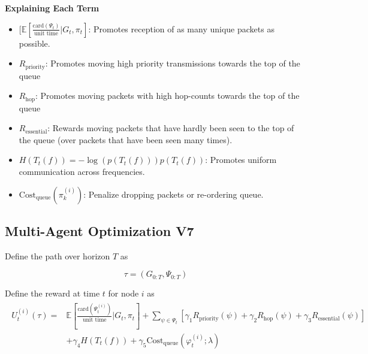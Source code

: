 \documentclass{article}
\begin{document}

\newpage
\textbf{Explaining Each Term}
\begin{itemize}
    \item $ [ \mathbb{E}[\frac{\text{card}(\Psi_{t})}{\text{unit time}} | G_{t}, \pi_{t}]$: Promotes reception of as many unique packets as possible.
    \item $R_{\text{priority}}$: Promotes moving high priority transmissions towards the top of the queue
    
    \item $R_{\text{hop}}$: Promotes moving packets with high hop-counts towards the top of the queue

    \item $R_{\text{essential}}$: Rewards moving packets that have hardly been seen to the top of the queue (over packets that have been seen many times).
    
    \item $H(T_{t}(f))= -\log(p(T_{t}(f))) p(T_{t}(f))$: Promotes uniform communication across frequencies.
    \item $\text{Cost}_{\text{queue}}(\pi_{k}^{(i)})$: Penalize dropping packets or re-ordering queue.
\end{itemize}

\newpage


\subsection{Multi-Agent Optimization V7}


Define the path over horizon $T$ as

$$
\tau = (G_{0:T}, \Psi_{0:T})
$$

Define the reward at time $t$ for node $i$ as
\begin{align*}
    \begin{split}
            U_{t}^{(i)} (\tau)  =
            &\mathbb{E}[\frac{\text{card}(\Psi_{t}^{(i)})}{\text{unit time}} | G_{t}, \pi_{t}] + \sum_{\psi \in \Psi_{t}}[ \gamma_{1} R_{\text{priority}}(\psi) + \gamma_{2} R_{\text{hop}}(\psi)  +  \gamma_{3} R_{\text{essential}}(\psi)]
            \\ &+ \gamma_{4} H(T_{t}(f)) + \gamma_{5} \text{Cost}_{\text{queue}}(\varphi_{t}^{(i)}; \lambda)
    \end{split}
\end{align*}\nonumber
\end{document}
